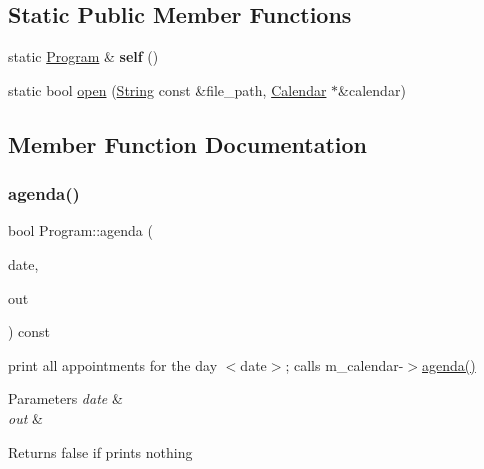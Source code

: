 \subsection*{Static Public Member Functions}
\begin{DoxyCompactItemize}
\item 
\mbox{\label{classProgram_a6f703bef529f93987481e04ab6f3014a}} 
static \hyperlink{classProgram}{Program} \& {\bfseries self} ()
\item 
static bool \hyperlink{classProgram_ad12fa0703d93dbec2b2badc96ab97cf6}{open} (\hyperlink{classString}{String} const \&file\+\_\+path, \hyperlink{classCalendar}{Calendar} $\ast$\&calendar)
\end{DoxyCompactItemize}


\subsection{Member Function Documentation}
\mbox{\label{classProgram_a36916661bfce488ed07dbc2a7f3fadce}} 
\subsubsection{\texorpdfstring{agenda()}{agenda()}}
{\footnotesize\ttfamily bool Program\+::agenda (\begin{DoxyParamCaption}\item[{\hyperlink{classDate}{Date} const \&}]{date,  }\item[{std\+::ostream \&}]{out }\end{DoxyParamCaption}) const}

print all appointments for the day $<$date$>$; calls m\+\_\+calendar-\/$>$\hyperlink{classProgram_a36916661bfce488ed07dbc2a7f3fadce}{agenda()} 
\begin{DoxyParams}{Parameters}
{\em date} & \\
\hline
{\em out} & \\
\hline
\end{DoxyParams}
\begin{DoxyReturn}{Returns}
false if prints nothing 
\end{DoxyReturn}
\mbox{\label{classProgram_a3fd5b4cf3d1eaa58809f593ccdc7a2d3}} 
